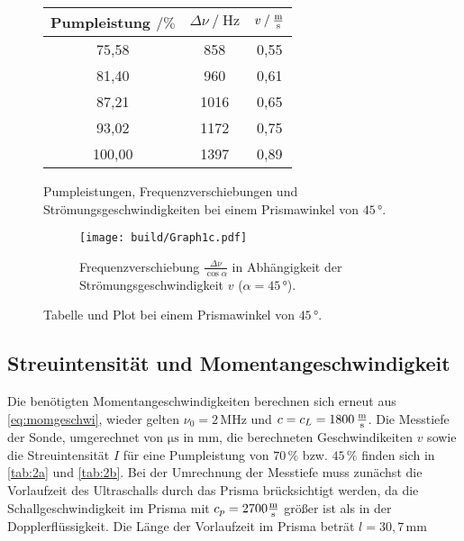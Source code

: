 \begin{figure}
    \begin{subtable}{0.43\textwidth}
        \centering
       \begin{tabular}{c c c}
        \toprule 
        {Pumpleistung $\mathbin{/}\%$} & {$\Delta \nu \mathbin{/} \unit{\hertz}$} & {$v \mathbin{/} \unit{\frac{\meter}{\second}}$}  \\
        \midrule 
                 75,58     &     858   & 0,55 \\
                 81,40     &     960   & 0,61 \\
                 87,21     &     1016  & 0,65 \\
                 93,02     &     1172  & 0,75 \\
                100,00     &     1397  & 0,89 \\
        \bottomrule
       \end{tabular}
       \caption{Pumpleistungen, Frequenzverschiebungen und Strömungsgeschwindigkeiten bei einem Prismawinkel von $45 \,°$.}
        \label{tab:1winkel3}
    \end{subtable}
    \begin{subfigure}{0.57\textwidth} 
        \centering
        \texttt{[image: build/Graph1c.pdf]}  
        \caption{Frequenzverschiebung $\frac{\Delta \nu}{\cos\alpha}$ in Abhängigkeit der Strömungsgeschwindigkeit $v$ ($\alpha = 45 \,°$).}
        \label{fig:graph1c}
        \qquad
    \end{subfigure}
    \caption{Tabelle und Plot bei einem Prismawinkel von $45 \,°$.} 
\end{figure}    

\subsection{Streuintensität und Momentangeschwindigkeit}

Die benötigten Momentangeschwindigkeiten berechnen sich erneut aus \eqref{eq:momgeschwi}, wieder gelten $\nu_0 = 2 \,\unit{\mega\hertz}$ und $c = c_L = 1800 \,\unit{\frac{\meter}{\second}}$.
Die Messtiefe der Sonde, umgerechnet von $\unit{\micro\second}$ in $\unit{\milli\meter}$, die berechneten Geschwindikeiten $v$ sowie die Streuintensität $I$ für eine Pumpleistung von $70 \,\%$ bzw. $45 \,\%$ finden sich in \autoref{tab:2a} und \autoref{tab:2b}.
Bei der Umrechnung der Messtiefe muss zunächst die Vorlaufzeit des Ultraschalls durch das Prisma brücksichtigt werden, da die Schallgeschwindigkeit im Prisma mit $c_p = 2700 \unit{\frac{\meter}{\second}}$ größer ist als in der Dopplerflüssigkeit.
Die Länge der Vorlaufzeit im Prisma beträt $ l = 30,7 \, \unit{\milli\meter}$

